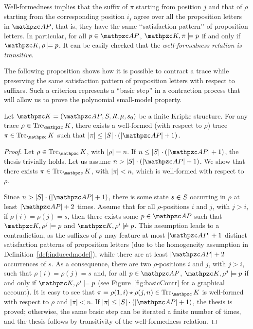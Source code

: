 Well-formedness implies that the suffix of $\pi$ starting from position $j$ and that of $\rho$ starting from the corresponding position $i_j$ agree over all the proposition letters in $\Prop$, that is, they have the same \lq\lq satisfaction pattern\rq\rq{} of proposition letters. In particular, for all $p\in \Prop$, $\Ku,\pi \models p$ if and only if $\Ku,\rho \models p$. It can be easily checked that the \emph{well-formedness relation is transitive}.

The following proposition shows how it is possible to contract a trace while preserving the same satisfaction pattern of proposition letters with respect to suffixes.  Such a criterion represents a ``basic step'' in a contraction process that will allow us to prove the polynomial small-model property. 

\begin{proposition}\label{proposition:wellFormdness}
Let $\Ku = \KuDef$ be a finite Kripke structure. For any trace $\rho\in\Trk_\Ku$, there exists a
well-formed (with respect to $\rho$) trace $\pi\in\Trk_\Ku$ such that $|\pi| \leq |\States|\cdot (|\Prop|+1)$.
\end{proposition}
\begin{proof}
Let $\rho\in\Trk_\Ku$, with $|\rho| = n$. If $n\leq |\States|\cdot (|\Prop|+1)$, the thesis trivially holds.
%
Let us assume $n > |\States|\cdot (|\Prop|+1)$. We show that there exists $\pi\in\Trk_\Ku$, with $|\pi| < n$, which is well-formed with respect to $\rho$.

Since $n> |\States|\cdot (|\Prop|+1)$, there is some state $s\in S$ occurring in $\rho$ at least $|\Prop|+2$ times.
Assume that for all $\rho$-positions $i$ and $j$, with $j>i$, if $\rho(i)=\rho(j)=s$, then there exists some $p\in\Prop$ such that $\Ku,\rho^j \models p$ and $\Ku,\rho^i \not\models p$. This assumption leads to a contradiction, as the suffixes of $\rho$ may feature at most $|\Prop|+1$ distinct satisfaction patterns of proposition letters (due to the homogeneity assumption in Definition~\ref{def:inducedmodel}), while there are at least $|\Prop|+2$ occurrences of $s$.
As a consequence, there are two $\rho$-positions $i$ and $j$, with $j>i$, such that $\rho(i)=\rho(j)=s$ and, for all $p\in\Prop$, $\Ku,\rho^j \models p$ if and only if $\Ku,\rho^i \models p$ (see Figure~\ref{fig:basicContr} for a graphical account).
%
It is easy to see that $\pi=\rho(1, i)\star\rho(j, n)\in\Trk_\Ku$ is well-formed with respect to $\rho$ and $|\pi| < n$.  If $|\pi| \leq |\States|\cdot (|\Prop|+1)$, the thesis is proved; otherwise, the same basic step can be iterated a finite number of times, and the thesis follows by transitivity of the well-formedness relation.
\end{proof}


